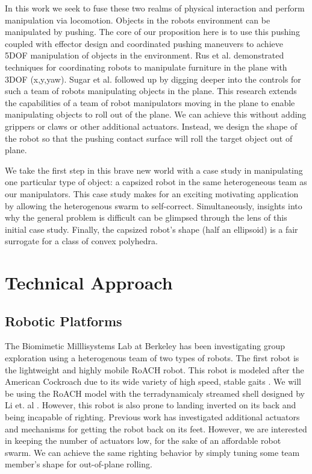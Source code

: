 \documentclass[a4paper]{article}
\begin{document}
In this work we seek to fuse these two realms of physical interaction and perform manipulation via locomotion.
Objects in the robots environment can be manipulated by pushing.
The core of our proposition here is to use this pushing coupled with effector design and coordinated pushing maneuvers to achieve 5DOF manipulation of objects in the environment.
Rus et al.\cite{rus1995moving} demonstrated techniques for coordinating robots to manipulate furniture in the plane with 3DOF (x,y,yaw).
Sugar et al. \cite{sugar2002control} followed up by digging deeper into the controls for such a team of robots manipulating objects in the plane.
This research extends the capabilities of a team of robot manipulators moving in the plane to enable manipulating objects to roll out of the plane.
We can achieve this without adding grippers or claws or other additional actuators.
Instead, we design the shape of the robot so that the pushing contact surface will roll the target object out of plane.

We take the first step in this brave new world with a case study in manipulating one particular type of object: a capsized robot in the same heterogeneous team as our manipulators.
This case study makes for an exciting motivating application by allowing the heterogenous swarm to self-correct.
Simultaneously, insights into why the general problem is difficult can be glimpsed through the lens of this initial case study.
Finally, the capsized robot's shape (half an ellipsoid) is a fair surrogate for a class of convex polyhedra.

\clearpage
\section{Technical Approach}
\subsection{Robotic Platforms}
The Biomimetic Milllisystems Lab at Berkeley has been investigating group exploration using a heterogenous team of two types of robots.
The first robot is the lightweight and highly mobile RoACH robot.
This robot is modeled after the American Cockroach due to its wide variety of high speed, stable gaits \cite{RoACH}.
We will be using the RoACH model with the terradynamicaly streamed shell designed by Li et. al \cite{li2015terradynamically}.
However, this robot is also prone to landing inverted on its back and being incapable of righting.
Previous work \cite{SelfFlip} has investigated additional actuators and mechanisms for getting the robot back on its feet.
However, we are interested in keeping the number of actuators low, for the sake of an affordable robot swarm.
We can achieve the same righting behavior by simply tuning some team member's shape for out-of-plane rolling.
\end{document}
